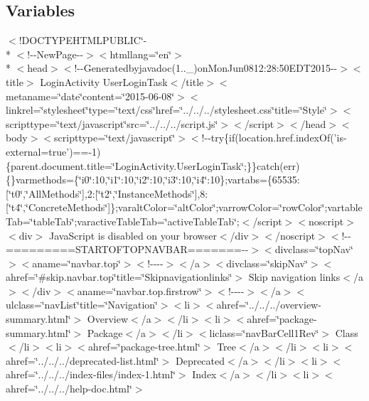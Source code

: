 \subsection*{Variables}
\begin{DoxyCompactItemize}
\item 
$<$!D\-O\-C\-T\-Y\-P\-E\-H\-T\-M\-L\-P\-U\-B\-L\-I\-C\char`\"{}-\/\\*
$<$!-\/-\/New\-Page-\/-\/$>$$<$htmllang=\char`\"{}en\char`\"{}$>$\\*
$<$head$>$$<$!-\/-\/Generatedbyjavadoc(1..\-\_)on\-Mon\-Jun0812\-:28\-:50\-E\-D\-T2015-\/-\/$>$$<$title$>$ Login\-Activity User\-Login\-Task$<$/title$>$$<$metaname=\char`\"{}date\char`\"{}content=\char`\"{}2015-\/06-\/08\char`\"{}$>$$<$linkrel=\char`\"{}stylesheet\char`\"{}type=\char`\"{}text/css\char`\"{}href=\char`\"{}../../../stylesheet.\-css\char`\"{}title=\char`\"{}\-Style\char`\"{}$>$$<$scripttype=\char`\"{}text/javascript\char`\"{}src=\char`\"{}../../../script.\-js\char`\"{}$>$$<$/script$>$$<$/head$>$$<$body$>$$<$scripttype=\char`\"{}text/javascript\char`\"{}$>$$<$!-\/-\/try\{if(location.\-href.\-index\-Of('is-\/external=true')==-\/1)\{parent.\-document.\-title=\char`\"{}\-Login\-Activity.\-User\-Login\-Task\char`\"{};\}\}catch(err)\{\}varmethods=\{\char`\"{}i0\char`\"{}\-:10,\char`\"{}i1\char`\"{}\-:10,\char`\"{}i2\char`\"{}\-:10,\char`\"{}i3\char`\"{}\-:10,\char`\"{}i4\char`\"{}\-:10\};vartabs=\{65535\-:\mbox{[}\char`\"{}t0\char`\"{},\char`\"{}\-All\-Methods\char`\"{}\mbox{]},2\-:\mbox{[}\char`\"{}t2\char`\"{},\char`\"{}\-Instance\-Methods\char`\"{}\mbox{]},8\-:\mbox{[}\char`\"{}t4\char`\"{},\char`\"{}\-Concrete\-Methods\char`\"{}\mbox{]}\};varalt\-Color=\char`\"{}alt\-Color\char`\"{};varrow\-Color=\char`\"{}row\-Color\char`\"{};vartable\-Tab=\char`\"{}table\-Tab\char`\"{};varactive\-Table\-Tab=\char`\"{}active\-Table\-Tab\char`\"{};$<$/script$>$$<$noscript$>$$<$div$>$ Java\-Script is disabled on your browser$<$/div$>$$<$/noscript$>$$<$!-\/-\/=========\-S\-T\-A\-R\-T\-O\-F\-T\-O\-P\-N\-A\-V\-B\-A\-R=======-\/-\/$>$$<$divclass=\char`\"{}top\-Nav\char`\"{}$>$$<$aname=\char`\"{}navbar.\-top\char`\"{}$>$$<$!-\/-\/-\/-\/$>$$<$/a$>$$<$divclass=\char`\"{}skip\-Nav\char`\"{}$>$$<$ahref=\char`\"{}\#skip.\-navbar.\-top\char`\"{}title=\char`\"{}\-Skipnavigationlinks\char`\"{}$>$ Skip navigation links$<$/a$>$$<$/div$>$$<$aname=\char`\"{}navbar.\-top.\-firstrow\char`\"{}$>$$<$!-\/-\/-\/-\/$>$$<$/a$>$$<$ulclass=\char`\"{}nav\-List\char`\"{}title=\char`\"{}\-Navigation\char`\"{}$>$$<$li$>$$<$ahref=\char`\"{}../../../overview-\/summary.\-html\char`\"{}$>$ Overview$<$/a$>$$<$/li$>$$<$li$>$$<$ahref=\char`\"{}package-\/summary.\-html\char`\"{}$>$ Package$<$/a$>$$<$/li$>$$<$liclass=\char`\"{}nav\-Bar\-Cell1\-Rev\char`\"{}$>$ Class$<$/li$>$$<$li$>$$<$ahref=\char`\"{}package-\/tree.\-html\char`\"{}$>$ Tree$<$/a$>$$<$/li$>$$<$li$>$$<$ahref=\char`\"{}../../../deprecated-\/list.\-html\char`\"{}$>$ Deprecated$<$/a$>$$<$/li$>$$<$li$>$$<$ahref=\char`\"{}../../../index-\/files/index-\/1.\-html\char`\"{}$>$ Index$<$/a$>$$<$/li$>$$<$li$>$$<$ahref=\char`\"{}../../../help-\/doc.\-html\char`\"{}$>$ $$
\end{DoxyCompactItemize}
